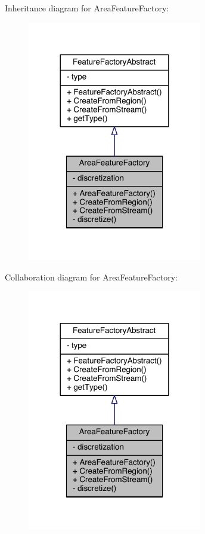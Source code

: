 Inheritance diagram for Area\+Feature\+Factory\+:\nopagebreak
\begin{figure}[H]
\begin{center}
\leavevmode
\includegraphics[width=216pt]{class_area_feature_factory__inherit__graph}
\end{center}
\end{figure}


Collaboration diagram for Area\+Feature\+Factory\+:\nopagebreak
\begin{figure}[H]
\begin{center}
\leavevmode
\includegraphics[width=216pt]{class_area_feature_factory__coll__graph}
\end{center}
\end{figure}



